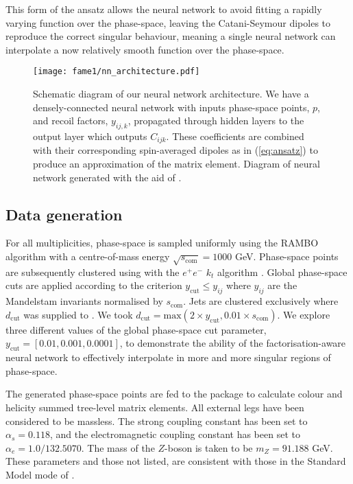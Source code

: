 \documentclass[main.tex]{subfiles}
\begin{document}
This form of the ansatz allows the neural network to avoid fitting a rapidly varying function over the phase-space, leaving the Catani-Seymour dipoles to reproduce the correct singular behaviour, meaning a single neural network can interpolate a now relatively smooth function over the phase-space.

\begin{figure}
    \texttt{[image: fame1/nn\_architecture.pdf]}
    \caption{Schematic diagram of our neural network architecture.
    We have a densely-connected neural network with inputs phase-space points, $p$, and recoil factors, $y_{ij,k}$, propagated through hidden layers to the output layer which outputs $C_{ijk}$.
    These coefficients are combined with their corresponding spin-averaged dipoles as in (\ref{eq:ansatz}) to produce an approximation of the matrix element.
    Diagram of neural network generated with the aid of \cite{LeNail2019}.}
    \label{fig:nn_architecture}
\end{figure}

\subsection{Data generation}\label{sec:data}
For all multiplicities, phase-space is sampled uniformly using the RAMBO algorithm \cite{Kleiss:1985gy} with a centre-of-mass energy $\sqrt{s_{\mathrm{com}}} = 1000$ GeV.
Phase-space points are subsequently clustered using {\FastJet} \cite{Cacciari:2011ma,noel_dawe_2021_4446849} with the $e^{+}e^{-}$ $k_{t}$ algorithm \cite{Catani:1991hj}.
Global phase-space cuts are applied according to the criterion $y_{\mathrm{cut}} \leq y_{ij}$ where $y_{ij}$ are the Mandelstam invariants normalised by $s_{\mathrm{com}}$.
Jets are clustered exclusively where $d_{\mathrm{cut}}$ was supplied to {\FastJet}. We took $d_{\mathrm{cut}} = \mathrm{max}(2 \times y_{\mathrm{cut}}, 0.01 \times s_{\mathrm{com}})$.
We explore three different values of the global phase-space cut parameter, $y_{\mathrm{cut}} = [0.01, 0.001, 0.0001]$, to demonstrate the ability of the factorisation-aware neural network to effectively interpolate in more and more singular regions of phase-space.

The generated phase-space points are fed to the {\NJet} package \cite{Badger:2012pg} to calculate colour and helicity summed tree-level matrix elements. 
All external legs have been considered to be massless. 
The strong coupling constant has been set to $\alpha_{s} = 0.118$, and the electromagnetic coupling constant has been set to $\alpha_{e} = 1.0 / 132.5070$.
The mass of the $Z$-boson is taken to be $m_{Z} = 91.188$ GeV.
These parameters and those not listed, are consistent with those in the Standard Model mode of \aNLO \cite{Alwall_2014}.
\end{document}
